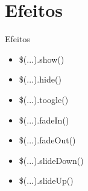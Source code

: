 \section{Efeitos}
\begin{frame}{Efeitos}
\begin{itemize}
	\pause\item \$(...).show()
	\pause\item \$(...).hide()
	\pause\item \$(...).toogle()
	\pause\item \$(...).fadeIn()
	\pause\item \$(...).fadeOut()
	\pause\item \$(...).slideDown()
	\pause\item \$(...).slideUp()
\end{itemize}
\end{frame}

